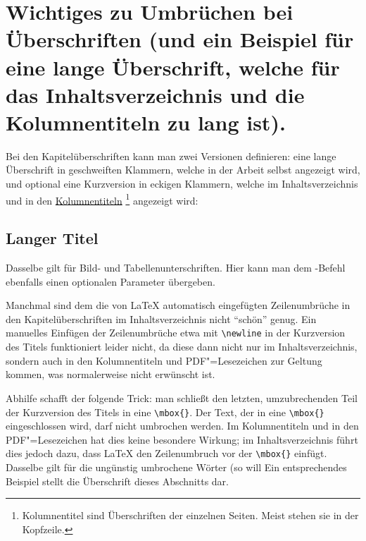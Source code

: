 \section[%
         Wichtiges zu Umbrüchen bei Überschriften
         \mbox{(Kurzversion für das Inhaltsverzeichnis etc.)}%
				]{%
         Wichtiges zu Umbrüchen bei Überschriften
         (und ein Beispiel \newline für eine lange Überschrift,
         welche \newline für das Inhaltsverzeichnis und 
         \newline die Kolumnentiteln zu lang ist).%
				}%
%
\label{chap:Titles}
%
%
Bei den Kapitelüberschriften kann man zwei Versionen definieren:
eine lange Überschrift in geschweiften Klammern, welche in der Arbeit selbst angezeigt wird, 
und optional eine Kurzversion in eckigen Klammern, welche im Inhaltsverzeichnis und in den 
\href{https://de.wikipedia.org/wiki/Kolumnentitel}{Kolumnentiteln}%
\footnote{Kolumnentitel sind Überschriften der einzelnen Seiten. Meist stehen sie in der Kopfzeile.}
angezeigt wird:
\begin{latex}
\section[Kurzversion]{Langer Titel}
\end{latex}
Dasselbe gilt für Bild- und Tabellenunterschriften. Hier kann man dem
-Befehl ebenfalls einen optionalen Parameter übergeben.

Manchmal sind dem  die von \LaTeX{} automatisch eingefügten Zeilenumbrüche in den Kapitelüberschriften im Inhaltsverzeichnis nicht \enquote{schön} genug.
Ein manuelles Einfügen der Zeilenumbrüche etwa mit \verb+\newline+ in der Kurzversion des Titels funktioniert leider nicht,
da diese dann nicht nur im Inhaltsverzeichnis, sondern auch in den Kolumnentiteln und PDF"=Lesezeichen zur Geltung kommen, 
was normalerweise nicht erwünscht ist.

Abhilfe schafft der folgende Trick:
man schließt den letzten, umzubrechenden Teil der Kurzversion des Titels in eine \verb+\mbox{}+.
Der Text, der in eine \verb+\mbox{}+ eingeschlossen wird, darf nicht umbrochen werden.
Im Kolumnentiteln und in den PDF"=Lesezeichen hat dies keine besondere Wirkung; im Inhaltsverzeichnis führt dies jedoch dazu, dass \LaTeX{} den Zeilenumbruch vor der \verb+\mbox{}+ einfügt.
Dasselbe gilt für die ungünstig umbrochene Wörter (so will 
Ein entsprechendes Beispiel stellt die Überschrift dieses Abschnitts dar.